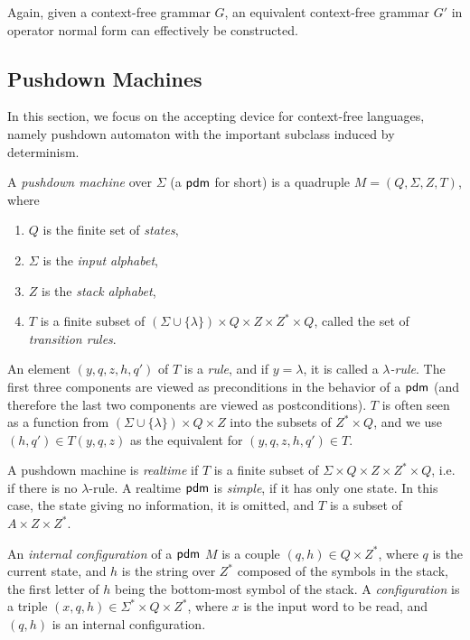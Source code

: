 Again, given a context-free grammar $G$, an equivalent context-free grammar $G'$ in operator normal form can effectively be constructed.

\subsection{Pushdown Machines}
\label{subsection:pushdown-machines}

In this section, we focus on the accepting device for context-free languages, namely pushdown automaton with the important subclass induced by determinism.

A \emph{pushdown machine} over $\Sigma$ (a \index{$\pdm$}$\pdm$ for short) is a quadruple $M = (Q, \Sigma, Z, T)$, where

\begin{enumerate}[]
\item $Q$ is the finite set of \emph{states},
\item $\Sigma$ is the \emph{input alphabet},
\item $Z$ is the \emph{stack alphabet},
\item $T$ is a finite subset of $(\Sigma \cup \{\lambda\}) \times Q \times Z \times Z^* \times Q$, called the set of \emph{transition rules}.
\end{enumerate}

An element $(y, q, z, h, q')$ of $T$ is a \emph{rule}, and if $y = \lambda$, it is called a \emph{$\lambda$-rule}. The first three components are viewed as preconditions in the behavior of a \index{$\pdm$}$\pdm$ (and therefore the last two components are viewed as postconditions). $T$ is often seen as a function from $(\Sigma \cup \{\lambda\}) \times Q \times Z$ into the subsets of $Z^* \times Q$, and we use $(h, q') \in T(y, q, z)$ as the equivalent for $(y, q, z, h, q') \in T$.

A pushdown machine is \emph{realtime} if $T$ is a finite subset of $\Sigma \times Q \times Z \times Z^* \times Q$, i.e. if there is no $\lambda$-rule. A realtime \index{$\pdm$}$\pdm$ is \emph{simple}, if it has only one state. In this case, the state giving no information, it is omitted, and $T$ is a subset of $A \times Z \times Z^*$.

An \emph{internal configuration} of a \index{$\pdm$}$\pdm$ $M$ is a couple $(q, h) \in Q \times Z^*$, where $q$ is the current state, and $h$ is the string over $Z^*$ composed of the symbols in the stack, the first letter of $h$ being the bottom-most symbol of the stack. A \emph{configuration} is a triple $(x, q, h) \in \Sigma^* \times Q \times Z^*$, where $x$ is the input word to be read, and $(q, h)$ is an internal configuration.

